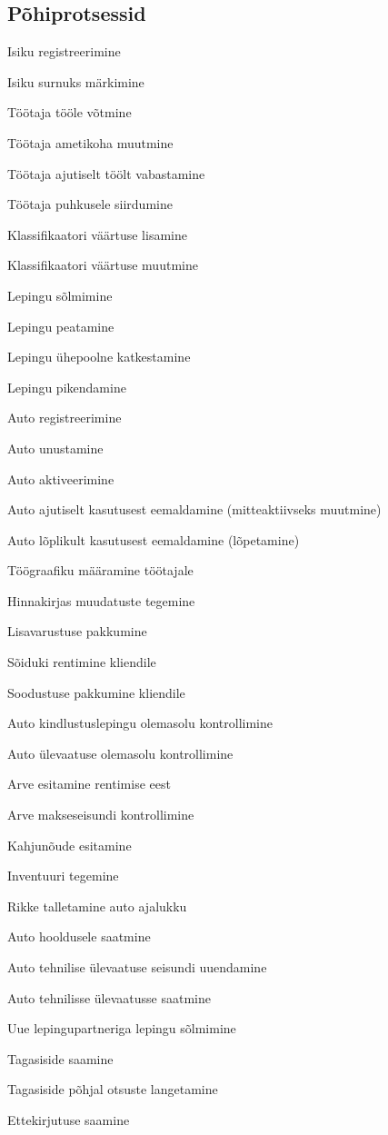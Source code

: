 \subsection{Põhiprotsessid}
\begin{myitemize}
	\item Isiku registreerimine
	\item Isiku surnuks märkimine
	\item Töötaja tööle võtmine
	\item Töötaja ametikoha muutmine
	\item Töötaja ajutiselt töölt vabastamine
	\item Töötaja puhkusele siirdumine
	\item Klassifikaatori väärtuse lisamine
	\item Klassifikaatori väärtuse muutmine
	\item Lepingu sõlmimine
	\item Lepingu peatamine
	\item Lepingu ühepoolne katkestamine
	\item Lepingu pikendamine
	\item Auto registreerimine
	\item Auto unustamine
	\item Auto aktiveerimine
	\item Auto ajutiselt kasutusest eemaldamine (mitteaktiivseks muutmine)
	\item Auto lõplikult kasutusest eemaldamine (lõpetamine)
	\item Töögraafiku määramine töötajale
	\item Hinnakirjas muudatuste tegemine
	\item Lisavarustuse pakkumine 
	\item Sõiduki rentimine kliendile
	\item Soodustuse pakkumine kliendile
	\item Auto kindlustuslepingu olemasolu kontrollimine
	\item Auto ülevaatuse olemasolu kontrollimine
	\item Arve esitamine rentimise eest
	\item Arve makseseisundi kontrollimine
	\item Kahjunõude esitamine
	\item Inventuuri tegemine
	\item Rikke talletamine auto ajalukku
	\item Auto hooldusele saatmine
	\item Auto tehnilise ülevaatuse seisundi uuendamine
	\item Auto tehnilisse ülevaatusse saatmine
	\item Uue lepingupartneriga lepingu sõlmimine
	\item Tagasiside saamine
	\item Tagasiside põhjal otsuste langetamine
	\item Ettekirjutuse saamine
\end{myitemize}

